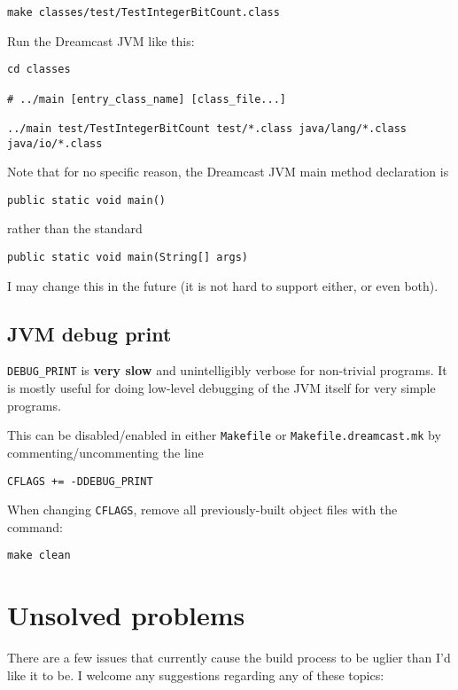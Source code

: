 \documentclass[20pt]{article}
\begin{document}
\begin{verbatim}
make classes/test/TestIntegerBitCount.class
\end{verbatim}

Run the Dreamcast JVM like this:

\begin{verbatim}
cd classes

# ../main [entry_class_name] [class_file...]

../main test/TestIntegerBitCount test/*.class java/lang/*.class java/io/*.class
\end{verbatim}

Note that for no specific reason, the Dreamcast JVM main method declaration is
\begin{verbatim}
public static void main()
\end{verbatim}
rather than the standard
\begin{verbatim}
public static void main(String[] args)
\end{verbatim}
I may change this in the future (it is not hard to support either, or even
both).

\subsection{JVM debug print}

\texttt{DEBUG\_PRINT} is \textbf{very slow} and unintelligibly verbose for
non-trivial programs. It is mostly useful for doing low-level debugging of the
JVM itself for very simple programs.

This can be disabled/enabled in either \texttt{Makefile} or
\texttt{Makefile.dreamcast.mk} by commenting/uncommenting the line
\begin{verbatim}
CFLAGS += -DDEBUG_PRINT
\end{verbatim}

When changing \texttt{CFLAGS}, remove all previously-built object files with the
command:

\begin{verbatim}
make clean
\end{verbatim}

\section{Unsolved problems}
\label{sec:unsolved}

There are a few issues that currently cause the build process to be uglier than
I'd like it to be. I welcome any suggestions regarding any of these topics:
\end{document}
